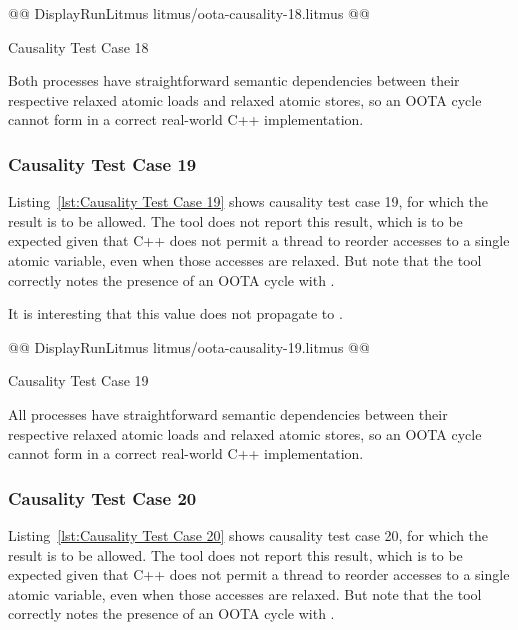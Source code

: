 \documentclass[10]{article}
\begin{document}
\begin{listing}[tbp]
@@ DisplayRunLitmus litmus/oota-causality-18.litmus @@
\caption{Causality Test Case 18}
\label{lst:Causality Test Case 18}
\end{listing}

Both processes have straightforward semantic dependencies between their
respective relaxed atomic loads and relaxed atomic stores, so an OOTA
cycle cannot form in a correct real-world C++ implementation.

\subsubsection{Causality Test Case 19}
\label{app:Causality Test Case 19}

Listing~\ref{lst:Causality Test Case 19}
shows causality test case 19, for which the 
result is to be allowed.
The  tool does not report this result, which is to be expected
given that C++ does not permit a thread to reorder accesses to a single
atomic variable, even when those accesses are relaxed.
But note that the  tool correctly notes the presence of an
OOTA cycle with .

It is interesting that this  value does not propagate to
.

\begin{listing}[tbp]
@@ DisplayRunLitmus litmus/oota-causality-19.litmus @@
\caption{Causality Test Case 19}
\label{lst:Causality Test Case 19}
\end{listing}

All processes have straightforward semantic dependencies between their
respective relaxed atomic loads and relaxed atomic stores, so an OOTA
cycle cannot form in a correct real-world C++ implementation.

\subsubsection{Causality Test Case 20}
\label{app:Causality Test Case 20}

Listing~\ref{lst:Causality Test Case 20}
shows causality test case 20, for which the 
result is to be allowed.
The  tool does not report this result, which is to be expected
given that C++ does not permit a thread to reorder accesses to a single
atomic variable, even when those accesses are relaxed.
But note that the  tool correctly notes the presence of an
OOTA cycle with .
\end{document}
